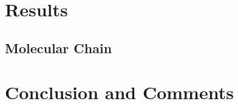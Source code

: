 \documentclass[10pt, titlepage, a4paper]{article}
\begin{document}
\section{Results}
\subsection{Molecular Chain}



\section{Conclusion and Comments}




\end{document}
